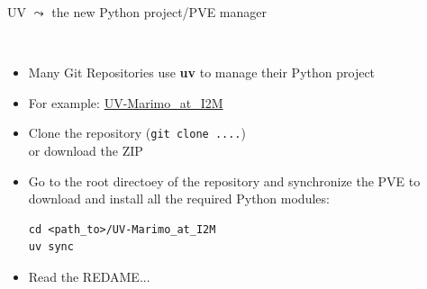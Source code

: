\documentclass[11pt, serif, mathserif, compress]{beamer}  %
\begin{document}
\begin{frame}[fragile]{UV $\leadsto$ the new Python project/PVE manager}
  
  \begin{bclogo}[noborder=true, couleur=gray!20, couleurBarre=Chocolate, logo=\raisebox{1mm}{\,\huge⚙}, marge=0, margeG=-0.6, margeD=-0.6,]
    {\ }
    \smallskip

    \begin{minipage}[t][][t]{1.\textwidth}
      \begin{itemize}\setlength\itemsep{3mm}
      \item<2-> Many Git Repositories use {\bf uv} to manage their Python project

      \item<3-> For example: \href{https://github.com/cjlux/UV-Marimo_at_I2M}{UV-Marimo\_at\_I2M}
        
      \item<4-> Clone the repository (\texttt{git clone ....})\\
        or download the ZIP
        
      \item<5-> Go to the root directoey of the repository and synchronize the PVE to download and install all the required Python modules:
        \begin{verbatim}
cd <path_to>/UV-Marimo_at_I2M
uv sync
        \end{verbatim}
      \item Read the REDAME...
      \end{itemize}
    \end{minipage}\begin{minipage}[t][][b]{.1\textwidth}
    \end{minipage}
  \end{bclogo}
  \vfill
\end{frame}
\end{document}
